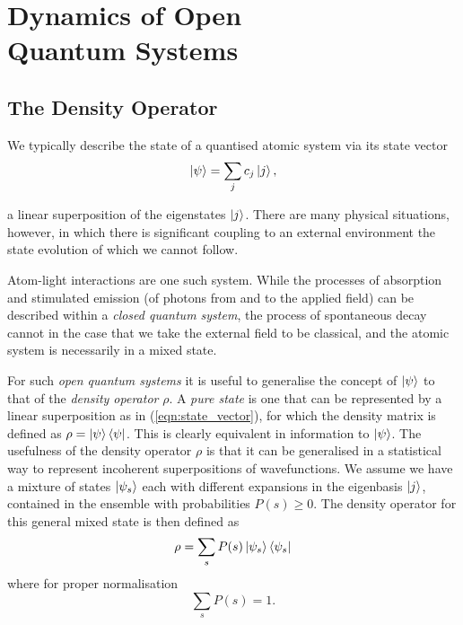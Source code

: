 \chapter[Dynamics of Open Quantum Systems]
  {Dynamics of Open\\ Quantum Systems}
  \label{apx:qu_dyn}

  \section{The Density Operator}

    We typically describe the state of a quantised atomic system via its state
    vector
    \begin{equation}
      \Ket{\psi} = \sum_j{c_j} \Ket{j},
      \label{eqn:state_vector}
    \end{equation}

    a linear superposition of the eigenstates $\Ket{j}$. There are many physical
    situations, however, in which there is significant coupling to an external
    environment the state evolution of which we cannot follow.

    Atom-light interactions are one such system. While the processes of
    absorption and stimulated emission (of photons from and to the applied
    field) can be described within a \textit{closed quantum system}, the process
    of spontaneous decay cannot in the case that we take the external field to
    be classical, and the atomic system is necessarily in a mixed state.

    For such \textit{open quantum systems} it is useful to generalise the
    concept of $\Ket{\psi}$ to that of the \textit{density operator} $\rho$. A
    \textit{pure state} is one that can be represented by a linear superposition
    as in (\ref{eqn:state_vector}), for which the density matrix is defined as
    $\rho = \Ket{\psi} \Bra{\psi}$. This is clearly equivalent in information to
    $\Ket{\psi}$. The usefulness of the density operator $\rho$ is that it can
    be generalised in a statistical way to represent incoherent superpositions
    of wavefunctions. We assume we have a mixture of states $\Ket{\psi_s}$ each
    with different expansions in the eigenbasis $\Ket{j}$, contained in the
    ensemble with probabilities $P(s) \ge 0$. The density operator for this
    general mixed state is then defined as
    \begin{equation}
      \rho = \sum_s P(s) \Ket{\psi_s} \Bra{\psi_s}
    \end{equation}
    where for proper normalisation
    \begin{equation}
      \sum_s P(s) = 1.
    \end{equation}

